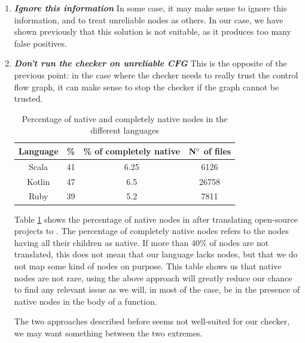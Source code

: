 \begin{enumerate}
\item \textbf{\textit{Ignore this information}} \newline
In some case, it may make sense to ignore this information, and to treat unreliable nodes as others. 
In our case, we have shown previously that this solution is not suitable, as it produces too many false positives. \newline

\item \textbf{\textit{Don’t run the checker on unreliable CFG}} \newline
This is the opposite of the previous point: in the case where the checker needs to really trust the control flow graph, it can make sense to stop the checker if the graph cannot be trusted.

\begin{table}[h]
	\centering
	\caption{Percentage of native and completely native nodes in the different languages}
	\label{table:slang-native-percentage}
	\begin{tabular}{|c|c|c|c|}
		\hline
		\bf Language & \bf \% & \bf \% of completely native & \bf $\bf N^{\circ}$  of files \\ \hline
		Scala &  41 &  6.25 & 6126 \\ 
		Kotlin &  47 &  6.5 & 26758 \\ 
		Ruby &  39 &  5.2 &  7811 \\ \hline
	\end{tabular}
\end{table}

Table \ref{table:slang-native-percentage} shows the percentage of native nodes in \slang{} after translating open-source projects \cite{SlangSources:2019:Online} to \slang{}. 
The percentage of completely native nodes refers to the nodes having all their children as native. 
If more than $40\%$ of nodes are not translated, this does not mean that our language lacks nodes, but that we do not map some kind of nodes on purpose.
This table shows us that native nodes are not rare, using the above approach will greatly reduce our chance to find any relevant issue as we will, in most of the case, be in the presence of native nodes in the body of a function.

The two approaches described before seems not well-suited for our checker, we may want something between the two extremes.


\end{enumerate}

